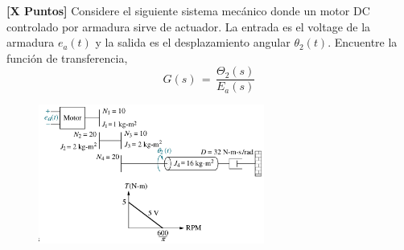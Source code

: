 \documentclass[ a4paper, twoside, 11pt]{article}
\begin{document}
\begin{problem}
\textbf{[X Puntos]} Considere el siguiente sistema mec\'anico donde un motor DC controlado por armadura sirve de actuador. La entrada es el voltage de la armadura $e_a(t)$ y la salida es el desplazamiento angular $\theta_2(t)$. Encuentre la funci\'on de transferencia, \iec
\[
G(s) \, = \, 
\frac{\Theta_2(s)}{E_a(s)}
\]
\begin{figure}[H]
\centering
\includegraphics[width=0.66\textwidth]{figures/Nise_Prob-2-43.jpg}
\end{figure}

\end{problem}
\vspace{\baselineskip}

%
\end{document}
